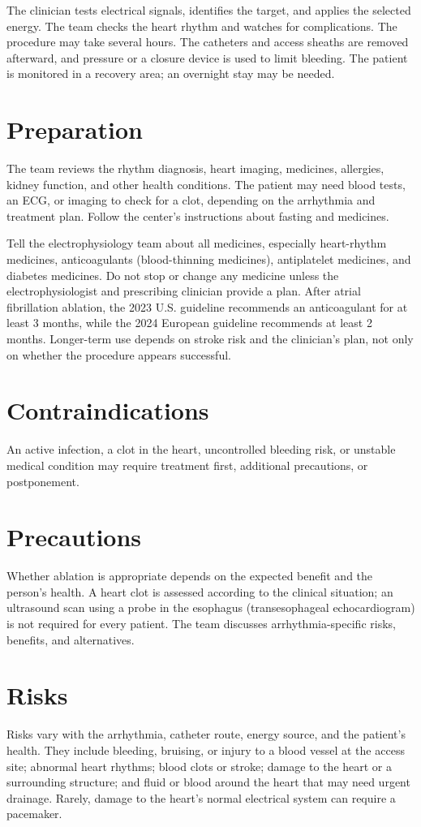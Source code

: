 The clinician tests electrical signals, identifies the target, and applies the selected energy. The team checks the heart rhythm and watches for complications. The procedure may take several hours. The catheters and access sheaths are removed afterward, and pressure or a closure device is used to limit bleeding. The patient is monitored in a recovery area; an overnight stay may be needed.

\section*{Preparation}
The team reviews the rhythm diagnosis, heart imaging, medicines, allergies, kidney function, and other health conditions. The patient may need blood tests, an ECG, or imaging to check for a clot, depending on the arrhythmia and treatment plan. Follow the center's instructions about fasting and medicines.

Tell the electrophysiology team about all medicines, especially heart-rhythm medicines, anticoagulants (blood-thinning medicines), antiplatelet medicines, and diabetes medicines. Do not stop or change any medicine unless the electrophysiologist and prescribing clinician provide a plan. After atrial fibrillation ablation, the 2023 U.S. guideline recommends an anticoagulant for at least 3 months, while the 2024 European guideline recommends at least 2 months. Longer-term use depends on stroke risk and the clinician's plan, not only on whether the procedure appears successful.

\section*{Contraindications}
An active infection, a clot in the heart, uncontrolled bleeding risk, or unstable medical condition may require treatment first, additional precautions, or postponement.

\section*{Precautions}
Whether ablation is appropriate depends on the expected benefit and the person's health. A heart clot is assessed according to the clinical situation; an ultrasound scan using a probe in the esophagus (transesophageal echocardiogram) is not required for every patient. The team discusses arrhythmia-specific risks, benefits, and alternatives.

\section*{Risks}
Risks vary with the arrhythmia, catheter route, energy source, and the patient's health. They include bleeding, bruising, or injury to a blood vessel at the access site; abnormal heart rhythms; blood clots or stroke; damage to the heart or a surrounding structure; and fluid or blood around the heart that may need urgent drainage. Rarely, damage to the heart's normal electrical system can require a pacemaker.

